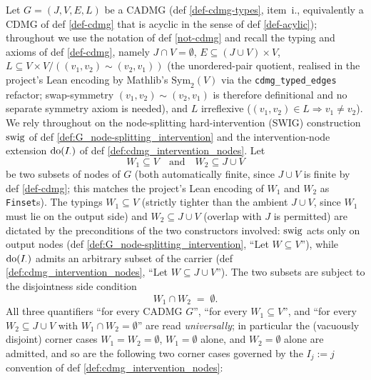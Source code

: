 \documentclass[main]{subfiles}
\begin{document}
\def\rowref{claim\_3\_15}
\label{claim_3_15}

\begin{Lem}\label{adding-intervention-nodes-commutes-with-disjoint-node-splitting-hard-interventions}
    Let $G = (J, V, E, L)$ be a CADMG (def \ref{def-cdmg-types}, item~i., equivalently a CDMG of def \ref{def-cdmg} that is acyclic in the sense of def \ref{def-acylic}); throughout we use the notation of def \ref{not-cdmg} and recall the typing and axioms of def \ref{def-cdmg}, namely $J \cap V = \emptyset$, $E \subseteq (J \cup V) \times V$, $L \subseteq V \times V / ((v_1, v_2) \sim (v_2, v_1))$ (the unordered-pair quotient, realised in the project's Lean encoding by Mathlib's $\text{Sym}_2(V)$ via the \texttt{cdmg\_typed\_edges} refactor; swap-symmetry $(v_1, v_2) \sim (v_2, v_1)$ is therefore definitional and no separate symmetry axiom is needed), and $L$ irreflexive ($(v_1, v_2) \in L \Rightarrow v_1 \neq v_2$). We rely throughout on the node-splitting hard-intervention (SWIG) construction $\mathrm{swig}$ of def \ref{def:G_node-splitting_intervention} and the intervention-node extension $\operatorname{do}(I_{\cdot})$ of def \ref{def:cdmg_intervention_nodes}. Let
    \[ W_1 \subseteq V \quad\text{and}\quad W_2 \subseteq J \cup V \]
    be two subsets of nodes of $G$ (both automatically finite, since $J \cup V$ is finite by def \ref{def-cdmg}; this matches the project's Lean encoding of $W_1$ and $W_2$ as \texttt{Finset}s). The typings $W_1 \subseteq V$ (strictly tighter than the ambient $J \cup V$, since $W_1$ must lie on the output side) and $W_2 \subseteq J \cup V$ (overlap with $J$ is permitted) are dictated by the preconditions of the two constructors involved: $\mathrm{swig}$ acts only on output nodes (def \ref{def:G_node-splitting_intervention}, ``Let $W \subseteq V$''), while $\operatorname{do}(I_{\cdot})$ admits an arbitrary subset of the carrier (def \ref{def:cdmg_intervention_nodes}, ``Let $W \subseteq J \cup V$''). The two subsets are subject to the disjointness side condition
    \[ W_1 \cap W_2 \;=\; \emptyset. \]
    All three quantifiers ``for every CADMG $G$'', ``for every $W_1 \subseteq V$'', and ``for every $W_2 \subseteq J \cup V$ with $W_1 \cap W_2 = \emptyset$'' are read \emph{universally}; in particular the (vacuously disjoint) corner cases $W_1 = W_2 = \emptyset$, $W_1 = \emptyset$ alone, and $W_2 = \emptyset$ alone are admitted, and so are the following two corner cases governed by the $I_j := j$ convention of def \ref{def:cdmg_intervention_nodes}:

\end{Lem}
\end{document}
